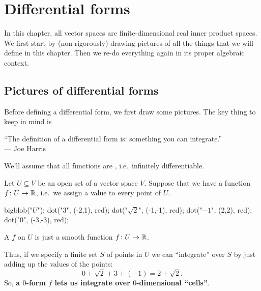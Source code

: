 \chapter{Differential forms}
In this chapter, all vector spaces are finite-dimensional
real inner product spaces.
We first start by (non-rigorously) drawing pictures
of all the things that we will define in this chapter.
Then we re-do everything again in its proper algebraic context.

\section{Pictures of differential forms}
Before defining a differential form,
we first draw some pictures.
The key thing to keep in mind is
\begin{moral}
	``The definition of a differential form is:
	something you can integrate.'' \\ --- Joe Harris
\end{moral}

We'll assume that all functions are ,
i.e.\ infinitely differentiable.

Let $U \subseteq V$ be an open set of a vector space $V$.
Suppose that we have a function $f \colon U \to \mathbb R$, i.e.\
we assign a value to every point of $U$.
\begin{center}
	\begin{asy}
		bigblob("$U$");
		dot("$3$", (-2,1), red);
		dot("$\sqrt2$", (-1,-1), red);
		dot("$-1$", (2,2), red);
		dot("$0$", (-3,-3), red);
	\end{asy}
\end{center}
\begin{definition}
	A  $f$ on $U$ is just a smooth function $f \colon U \to \mathbb R$.
\end{definition}
Thus, if we specify a finite set $S$ of points in $U$
we can ``integrate'' over $S$ by just adding up the values
of the points:
\[ 0 + \sqrt 2 + 3 + (-1) = 2 + \sqrt2. \]
So, \textbf{a $0$-form $f$ lets us integrate over $0$-dimensional ``cells''}.

